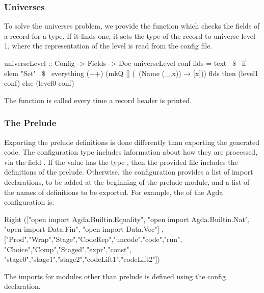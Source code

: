 \subsubsection{Universes}
To solve the universes problem, we provide the function  which checks the fields of a record for a  type. If it finds one, it sets the type of the record to universe level 1, where the representation of the level is read from the config file. 
\begin{hscode}
universeLevel :: Config -> Fields -> Doc
universeLevel conf flds =
  text ~$\$$~
    if elem "Set" ~$\$$~ everything (++) (mkQ [] (\ (Name (_,x)) → [x])) flds
    then (level1 conf) else (level0 conf)    
\end{hscode}
\noindent The function  is called every time a record header is printed. 

\subsubsection{The Prelude}
Exporting the prelude definitions is done differently than exporting the generated code. The configuration type includes information about how they are processed, via the field
. If the value has the type , then the provided file includes the definitions of the prelude. Otherwise, the configuration provides a list of import declarations, to be added at the beginning of the prelude module, and a list of the names of definitions to be exported. 
For example, the  of the Agda configuration is:  
\begin{hscode} 
 Right (["open import Agda.Builtin.Equality",
         "open import Agda.Builtin.Nat",
         "open import Data.Fin",
         "open import Data.Vec"]
      ,["Prod","Wrap","Stage","CodeRep","uncode","code","run",
        "Choice","Comp","Staged","expr","const",
        "stage0","stage1","stage2","codeLift1","codeLift2"])   
\end{hscode} 
\noindent The imports for modules other than prelude is defined using the  config declaration. 

